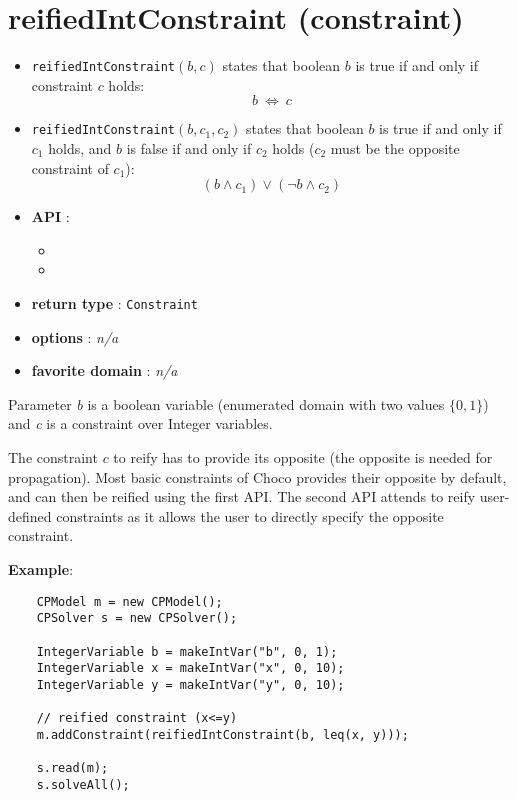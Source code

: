 \label{reifiedintconstraint}
\hypertarget{reifiedintconstraint}{}

\section{reifiedIntConstraint (constraint)}\label{reifiedintconstraint:reifiedintconstraintconstraint}\hypertarget{reifiedintconstraint:reifiedintconstraintconstraint}{}
\begin{notedef}
  \begin{itemize}
  \item \texttt{reifiedIntConstraint}$(b,c)$ states that boolean $b$ is true if and only if constraint $c$ holds:
  $$b\ \iff\ c$$
  \item \texttt{reifiedIntConstraint}$(b,c_1,c_2)$ states that boolean $b$ is true if and only if $c_1$ holds, and $b$ is false if and only if $c_2$ holds ($c_2$ must be the opposite constraint of $c_1$):
$$(b\land c_1) \lor (\neg b \land c_2)$$
  \end{itemize}
\end{notedef}

\begin{itemize}
	\item \textbf{API} :
	\begin{itemize}
		\item {}
		\item {}
	\end{itemize}
	\item \textbf{return type} : \texttt{Constraint}
	\item \textbf{options} : \emph{n/a}
	\item \textbf{favorite domain} : \emph{n/a}
\end{itemize}

Parameter \emph{b} is a boolean variable (enumerated domain with two values $\{0,1\}$) and \emph{c} is a constraint over Integer variables.

The constraint $c$ to reify has to provide its opposite (the opposite is needed for propagation). Most basic constraints of Choco provides their opposite by default, and can then be reified using the first API.
The second API attends to reify user-defined constraints as it allows the user to directly specify the opposite constraint.

\textbf{Example}:

\begin{lstlisting}
	CPModel m = new CPModel();
	CPSolver s = new CPSolver();
	
	IntegerVariable b = makeIntVar("b", 0, 1);
	IntegerVariable x = makeIntVar("x", 0, 10);
	IntegerVariable y = makeIntVar("y", 0, 10);
	
    // reified constraint (x<=y)
    m.addConstraint(reifiedIntConstraint(b, leq(x, y)));
	
	s.read(m);
	s.solveAll();
\end{lstlisting}
